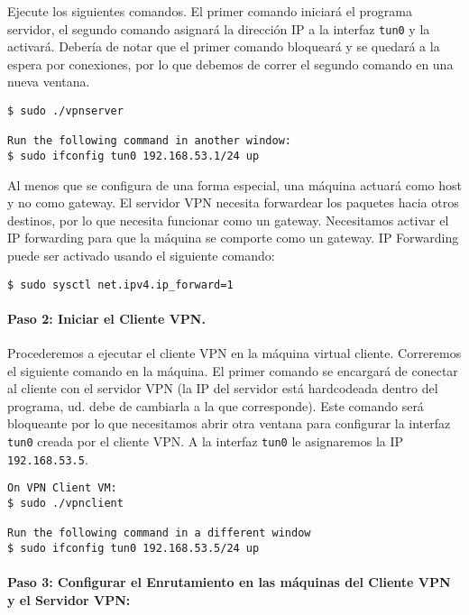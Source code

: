 Ejecute los siguientes comandos. El primer comando iniciará el programa servidor, el segundo comando asignará la dirección IP a la interfaz \texttt{tun0} y la activará. Debería de notar que el primer comando bloqueará y se quedará a la espera por conexiones, por lo que debemos de correr el segundo comando en una nueva ventana.

\begin{lstlisting}
$ sudo ./vpnserver

Run the following command in another window:
$ sudo ifconfig tun0 192.168.53.1/24 up
\end{lstlisting}

Al menos que se configura de una forma especial, una máquina actuará como host y no como gateway. El servidor VPN necesita forwardear los paquetes hacia otros destinos, por lo que necesita funcionar como un gateway. Necesitamos activar el IP forwarding para que la máquina se comporte como un gateway.
IP Forwarding puede ser activado usando el siguiente comando:

\begin{lstlisting}
$ sudo sysctl net.ipv4.ip_forward=1
\end{lstlisting}



\paragraph{Paso 2: Iniciar el Cliente VPN.}
Procederemos a ejecutar el cliente VPN en la máquina virtual cliente. Correremos el siguiente comando en la máquina. El primer comando se encargará de conectar al cliente con el servidor VPN (la IP del servidor está hardcodeada dentro del programa, ud. debe de cambiarla a la que corresponde). Este comando será bloqueante por lo que necesitamos abrir otra ventana para configurar la interfaz \texttt{tun0} creada por el cliente VPN.
A la interfaz \texttt{tun0} le asignaremos la IP \texttt{192.168.53.5}.


\begin{lstlisting}
On VPN Client VM:
$ sudo ./vpnclient 

Run the following command in a different window
$ sudo ifconfig tun0 192.168.53.5/24 up
\end{lstlisting}



\paragraph{Paso 3: Configurar el Enrutamiento en las máquinas del Cliente VPN y el Servidor VPN:} 

